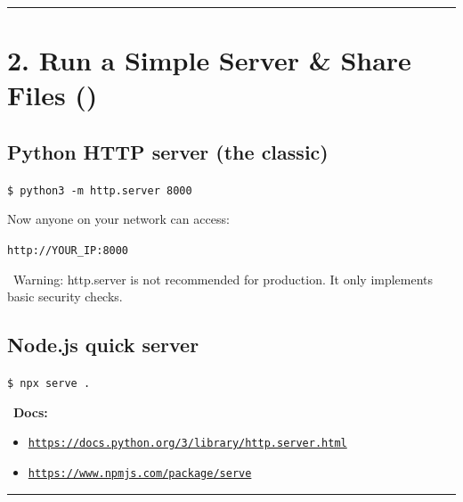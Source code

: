 \documentclass[12pt]{article}
\newcommand{\servericon}{\faServer}
\newcommand{\warningicon}{\faExclamationTriangle}
\newcommand{\bookicon}{\faBook}
\begin{document}
\vspace{1em}
\begin{center}
\color{teamred}\rule{0.8\textwidth}{1pt}
\end{center}

\section*{2. Run a Simple Server \& Share Files (\servericon)}

\subsection*{Python HTTP server (the classic)}

\begin{highlightbox}
\texttt{\$ python3 -m http.server 8000}
\end{highlightbox}

Now anyone on your network can access:

\begin{highlightbox}
\texttt{http://YOUR\_IP:8000}
\end{highlightbox}

\begin{warningbox}
\warningicon\ Warning: http.server is not recommended for production. It only implements basic security checks.
\end{warningbox}

\subsection*{Node.js quick server}

\begin{highlightbox}
\texttt{\$ npx serve .}
\end{highlightbox}

\begin{infobox}
\bookicon\ \textbf{Docs:}
\begin{itemize}
    \item \href{https://docs.python.org/3/library/http.server.html}{\texttt{https://docs.python.org/3/library/http.server.html}}
    \item \href{https://www.npmjs.com/package/serve}{\texttt{https://www.npmjs.com/package/serve}}
\end{itemize}
\end{infobox}

\vspace{1em}
\begin{center}
\color{teamred}\rule{0.8\textwidth}{1pt}
\end{center}
\end{document}
